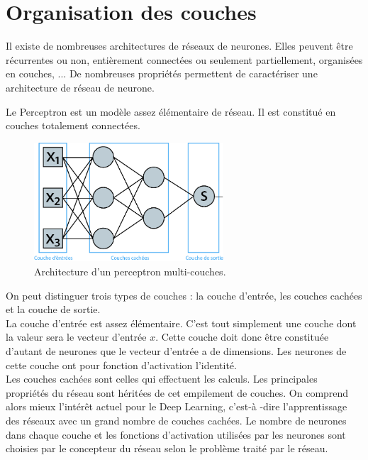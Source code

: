 \documentclass[a4paper,oneside]{report}
\begin{document}
            \section{Organisation des couches}

                Il existe de nombreuses architectures de réseaux de neurones. Elles peuvent être récurrentes ou non, entièrement connectées ou seulement partiellement, organisées en couches, ... De nombreuses propriétés permettent de caractériser une architecture de réseau de neurone.

                Le Perceptron est un modèle assez élémentaire de réseau. Il est constitué en couches totalement connectées.

                \begin{figure}
                    \begin{center}
                        \includegraphics[width=200pt]{Images/perceptron-01.png}
                    \end{center}
                    \caption{Architecture d'un perceptron multi-couches.}
                \end{figure}

                On peut distinguer trois types de couches : la couche d'entrée, les couches cachées et la couche de sortie.\\

                La couche d'entrée est assez élémentaire. C'est tout simplement une couche dont la valeur sera le vecteur d'entrée $x$. Cette couche doit donc être constituée d'autant de neurones que le vecteur d'entrée a de dimensions. Les neurones de cette couche ont pour fonction d'activation l'identité.\\

                Les couches cachées sont celles qui effectuent les calculs. Les principales propriétés du réseau sont héritées de cet empilement de couches. On comprend alors mieux l'intérêt actuel pour le Deep Learning, c'est-à -dire l'apprentissage des réseaux avec un grand nombre de couches cachées.
                Le nombre de neurones dans chaque couche et les fonctions d'activation utilisées par les neurones sont choisies par le concepteur du réseau selon le problème traité par le réseau.\\
\end{document}
